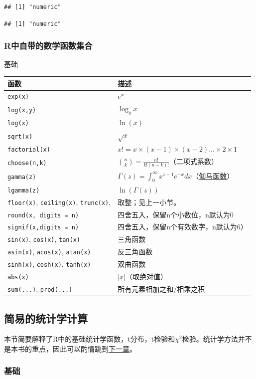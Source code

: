 \documentclass[]{book}
\begin{document}
\begin{verbatim}
## [1] "numeric"
\end{verbatim}

\begin{verbatim}
## [1] "numeric"
\end{verbatim}

\hypertarget{r}{%
\subsubsection{R中自带的数学函数集合}\label{r}}

基础

\begin{longtable}[]{@{}ll@{}}
\toprule
函数 & 描述\tabularnewline
\midrule
\endhead
\texttt{exp(x)} & \(e^x\)\tabularnewline
\texttt{log(x,y)} & \(\log_yx\)\tabularnewline
\texttt{log(x)} & \(\ln(x)\)\tabularnewline
\texttt{sqrt(x)} & \(\sqrt{x}\)\tabularnewline
\texttt{factorial(x)} & \(x!=x\times(x-1)\times(x-2)\ldots\times2\times1\)\tabularnewline
\texttt{choose(n,k)} & \(\binom{n}{k}=\frac{n!}{k!(n-k)!}\)（二项式系数）\tabularnewline
\texttt{gamma(z)} & \(\Gamma(z)=\int_0^\infty x^{z-1}e^{-x}dx\)（\href{https://en.wikipedia.org/wiki/Gamma_function}{伽马函数}）\tabularnewline
\texttt{lgamma(z)} & \(\ln(\Gamma(z))\)\tabularnewline
\texttt{floor(x)}, \texttt{ceiling(x)}, \texttt{trunc(x)}, & 取整；见上一小节。\tabularnewline
\texttt{round(x,\ digits\ =\ n)} & 四舍五入，保留n个小数位，n默认为0\tabularnewline
\texttt{signif(x,digits\ =\ n)} & 四舍五入，保留n个有效数字，n默认为6）\tabularnewline
\texttt{sin(x)}, \texttt{cos(x)}, \texttt{tan(x)} & 三角函数\tabularnewline
\texttt{asin(x)}, \texttt{acos(x)}, \texttt{atan(x)} & 反三角函数\tabularnewline
\texttt{sinh(x)}, \texttt{cosh(x)}, \texttt{tanh(x)} & 双曲函数\tabularnewline
\texttt{abs(x)} & \(|x|\)（取绝对值）\tabularnewline
\texttt{sum(...)}, \texttt{prod(...)} & 所有元素相加之和/相乘之积\tabularnewline
\bottomrule
\end{longtable}

\hypertarget{statistics}{%
\subsection{简易的统计学计算}\label{statistics}}

本节简要解释了R中的基础统计学函数，t分布，t检验和\(\chi^2\)检验。统计学方法并不是本书的重点，因此可以酌情跳到\protect\hyperlink{tibble}{下一章}。

\subsubsection{基础}
\end{document}
